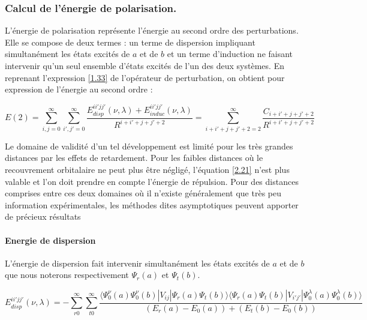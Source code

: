 	
	\subsubsection{Calcul de l’énergie de polarisation.}
	
	L'énergie de polarisation représente l'énergie au second ordre des perturbations. Elle se compose de deux termes : un terme de dispersion impliquant simultanément les états excités de $a$ et de $b$ et un terme d'induction ne faisant intervenir qu'un seul ensemble d'états excités de l'un des deux systèmes. En reprenant l'expression \ref{1.33} de l'opérateur de perturbation, on obtient pour expression de l'énergie au second ordre : 
	
	\begin{equation}
	E(2) = \sum_{i,j=0}^{\infty} \sum_{i',j'=0}^{\infty} \frac{E_{disp}^{ii'jj'} (\nu , \lambda) + E_{induc}^{ii'jj'}(\nu , \lambda)}{R^{i+i'+j+j'+2}} = \sum_{i+i'+j+j'+2=2}^{\infty} \frac{C_{i+i'+j+j'+2}}{R^{i+i'+j+j'+2}} \label{2.21}
	\end{equation}
	
	Le domaine de validité d'un tel développement est limité pour les très grandes distances par les effets de retardement. Pour les faibles distances où le recouvrement orbitalaire ne peut plus être négligé, l'équation \ref{2.21} n'est plus valable et l'on doit prendre en compte l'énergie de répulsion. Pour des distances comprises entre ces deux domaines où il n'existe généralement que très peu information expérimentales, les méthodes dites asymptotiques peuvent apporter de précieux résultats
	
	
	\paragraph{Energie de dispersion}
	
	L'énergie de dispersion fait intervenir simultanément les états excités de $a$ et de $b$ que nous noterons respectivement $\Psi_{r}(a)$ et $\Psi_{t}(b)$.
	
	\begin{equation}
	E_{disp}^{ii'jj'} (\nu , \lambda) = - \sum_{r0}^{\infty} \sum_{t0}^{\infty} \frac{\langle \Psi_{0}^{\nu} (a) \Psi_{0}^{\nu} (b)| V_{ij}|\Psi_{r} (a) \Psi_{t} (b) \rangle  \langle \Psi_{r} (a) \Psi_{t} (b) |V_{i'j'}| \Psi_{0}^{\lambda} (a) \Psi_{0}^{\lambda}(b) \rangle}{(E_{r} (a) - E_{0} (a)) + (E_{t} (b) - E_{0} (b))} \label{2.22}
	\end{equation}
	
